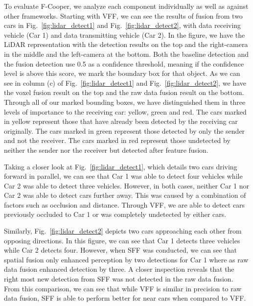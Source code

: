 \documentclass[sigconf]{acmart}
\begin{document}
To evaluate F-Cooper, we analyze each component individually as well as against other frameworks. Starting with VFF, we can see the results of fusion from two cars in Fig.~\ref{fig:lidar_detect1} and Fig.~\ref{fig:lidar_detect2}, with data receiving vehicle (Car 1) and data transmitting vehicle (Car 2). In the figure, we have the LiDAR representation with the detection results on the top and the right-camera in the middle and the left-camera at the bottom. Both the baseline detection and the fusion detection use 0.5 as a confidence threshold, meaning if the confidence level is above this score, we mark the boundary box for that object. As we can see in column (c) of Fig.~\ref{fig:lidar_detect1} and Fig.~\ref{fig:lidar_detect2}, we have the voxel fusion result on the top and the raw data fusion result on the bottom. Through all of our marked bounding boxes, we have distinguished them in three levels of importance to the receiving car: yellow, green and red. The cars marked in yellow represent those that have already been detected by the receiving car originally. The cars marked in green represent those detected by only the sender and not the receiver. The cars marked in red represent those undetected by neither the sender nor the receiver but detected after feature fusion.

Taking a closer look at Fig.~\ref{fig:lidar_detect1}, which details two cars driving forward in parallel, we can see that Car 1 was able to detect four vehicles while Car 2 was able to detect three vehicles. However, in both cases, neither Car 1 nor Car 2 was able to detect cars further away. This was caused by a combination of factors such as occlusion and distance. Through VFF, we are able to detect cars previously occluded to Car 1 or was completely undetected by either cars. 

Similarly, Fig.~\ref{fig:lidar_detect2} depicts two cars approaching each other from opposing directions. In this figure, we can see that Car 1 detects three vehicles while Car 2 detects four. However, when SFF was conducted, we can see that spatial fusion only enhanced perception by two detections for Car 1 where as raw data fusion enhanced detection by three. A closer inspection reveals that the right most new detection from SFF was not detected in the raw data fusion. 
From this comparison, we can see that while VFF is similar in precision to raw data fusion, SFF is able to perform better for near cars when compared to VFF.
\end{document}
